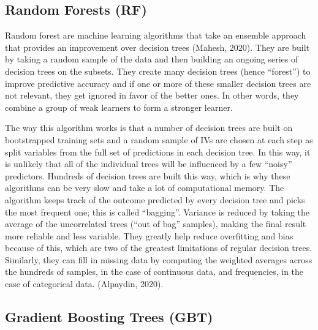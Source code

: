 \documentclass[
  man]{apa7}
\begin{document}
\hypertarget{random-forests-rf}{%
\subsection{Random Forests (RF)}\label{random-forests-rf}}

Random forest are machine learning algorithms that take an ensemble approach that provides an improvement over decision trees (Mahesh, 2020).
They are built by taking a random sample of the data and then building an ongoing series of decision trees on the subsets.
They create many decision trees (hence ``forest'') to improve predictive accuracy and if one or more of these smaller decision trees are not relevant, they get ignored in favor of the better ones.
In other words, they combine a group of weak learners to form a stronger learner.

The way this algorithm works is that a number of decision trees are built on bootstrapped training sets and a random sample of IVs are chosen at each step as split variables from the full set of predictions in each decision tree.
In this way, it is unlikely that all of the individual trees will be influenced by a few ``noisy'' predictors.
Hundreds of decision trees are built this way, which is why these algorithms can be very slow and take a lot of computational memory.
The algorithm keeps track of the outcome predicted by every decision tree and picks the most frequent one; this is called ``bagging''.
Variance is reduced by taking the average of the uncorrelated trees (``out of bag'' samples), making the final result more reliable and less variable.
They greatly help reduce overfitting and bias because of this, which are two of the greatest limitations of regular decision trees.
Similarly, they can fill in missing data by computing the weighted averages across the hundreds of samples, in the case of continuous data, and frequencies, in the case of categorical data.
(Alpaydin, 2020).

\hypertarget{gradient-boosting-trees-gbt}{%
\subsection{Gradient Boosting Trees (GBT)}\label{gradient-boosting-trees-gbt}}
\end{document}
